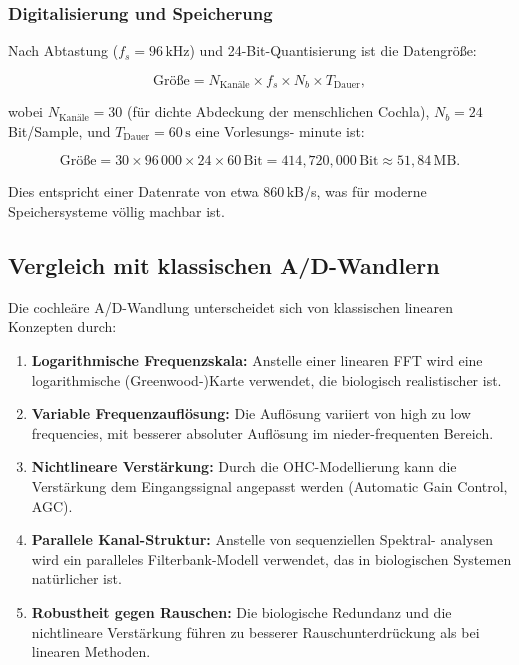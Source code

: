 ﻿\documentclass[12pt, a4paper]{article}
\theoremstyle{definition}
\theoremstyle{remark}
\begin{document}
\subsubsection{Digitalisierung und Speicherung}

Nach Abtastung ($f_s = 96\,\mathrm{kHz}$) und 24-Bit-Quantisierung ist die Datengröße:

\begin{equation}
\label{eq:data_size}
\text{Größe} = N_{\text{Kanäle}} \times f_s \times N_b \times T_{\text{Dauer}},
\end{equation}

wobei $N_{\text{Kanäle}} = 30$ (für dichte Abdeckung der menschlichen Cochla), 
$N_b = 24$ Bit/Sample, und $T_{\text{Dauer}} = 60\,\mathrm{s}$ eine Vorlesungs-
minute ist:

\begin{equation}
\text{Größe} = 30 \times 96\,000 \times 24 \times 60 \, \text{Bit}
= 414{,}720{,}000 \, \text{Bit} 
\approx 51{,}84 \, \mathrm{MB}.
\end{equation}

Dies entspricht einer Datenrate von etwa 860\,kB/s, was für moderne 
Speichersysteme völlig machbar ist.

\subsection{Vergleich mit klassischen A/D-Wandlern}

Die cochleäre A/D-Wandlung unterscheidet sich von klassischen linearen Konzepten 
durch:

\begin{enumerate}
\item \textbf{Logarithmische Frequenzskala:} Anstelle einer linearen FFT wird 
  eine logarithmische (Greenwood-)Karte verwendet, die biologisch realistischer ist.

\item \textbf{Variable Frequenzauflösung:} Die Auflösung variiert von high zu low 
  frequencies, mit besserer absoluter Auflösung im nieder-frequenten Bereich.

\item \textbf{Nichtlineare Verstärkung:} Durch die OHC-Modellierung kann die 
  Verstärkung dem Eingangssignal angepasst werden (Automatic Gain Control, AGC).

\item \textbf{Parallele Kanal-Struktur:} Anstelle von sequenziellen Spektral-
  analysen wird ein paralleles Filterbank-Modell verwendet, das in biologischen 
  Systemen natürlicher ist.

\item \textbf{Robustheit gegen Rauschen:} Die biologische Redundanz und die 
  nichtlineare Verstärkung führen zu besserer Rauschunterdrückung als bei 
  linearen Methoden.
\end{enumerate}
\end{document}
